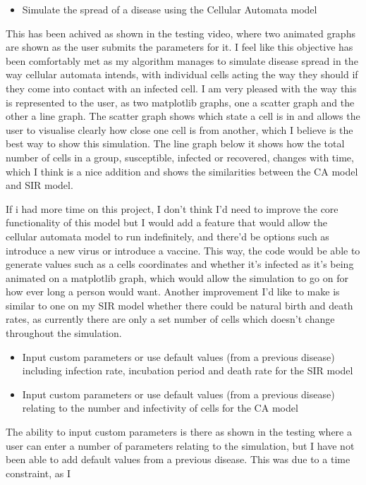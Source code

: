 \documentclass[11pt, a4paper]{article}
\begin{document}
\begin{itemize}
    \item Simulate the spread of a disease using the Cellular Automata model
\end{itemize}
This has been achived as shown in the testing video, where two animated graphs are shown as the user submits the parameters for it. I feel like this objective has been comfortably met as my algorithm manages to simulate disease spread in the way cellular automata intends, with individual cells acting the way they should if they come into contact with an infected cell. I am very pleased with the way this is represented to the user, as two matplotlib graphs, one a scatter graph and the other a line graph. The scatter graph shows which state a cell is in and allows the user to visualise clearly how close one cell is from another, which I believe is the best way to show this simulation. The line graph below it shows how the total number of cells in a group, susceptible, infected or recovered, changes with time, which I think is a nice addition and shows the similarities between the CA model and SIR model.

If i had more time on this project, I don't think I'd need to improve the core functionality of this model but I would add a feature that would allow the cellular automata model to run indefinitely, and there'd be options such as introduce a new virus or introduce a vaccine. This way, the code would be able to generate values such as a cells coordinates and whether it's infected as it's being animated on a matplotlib graph, which would allow the simulation to go on for how ever long a person would want. Another improvement I'd like to make is similar to one on my SIR model whether there could be natural birth and death rates, as currently there are only a set number of cells which doesn't change throughout the simulation.

\begin{itemize}
    \item Input custom parameters or use default values (from a previous disease) including infection rate, incubation period and death rate for the SIR model
    \item Input custom parameters or use default values (from a previous disease) relating to the number and infectivity of cells for the CA model
\end{itemize}
The ability to input custom parameters is there as shown in the testing where a user can enter a number of parameters relating to the simulation, but I have not been able to add default values from a previous disease. This was due to a time constraint, as I 
\end{document}
